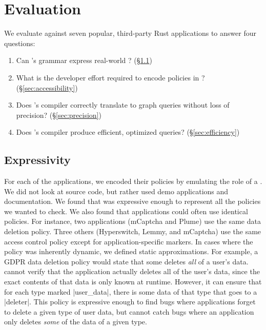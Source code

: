 \chapter{Evaluation}

We evaluate \syslang{} against seven popular, third-party Rust applications to answer four questions:
%
\begin{enumerate}[nosep]
    \item Can \syslang's grammar express real-world \policies? (\S\ref{sec:expressivity})
    \item What is the developer effort required to encode policies in \syslang? (\S\ref{sec:accessibility})
    \item Does \syslang's compiler correctly translate \policies to graph queries without loss of precision? (\S\ref{sec:precision})
    \item Does \syslang's compiler produce efficient, optimized queries? (\S\ref{sec:efficiency})
\end{enumerate}
%

\section{Expressivity}
\label{sec:expressivity}

For each of the applications, we encoded their \syslang{} policies by
emulating the role of a \ce{}.
%
We did not look at source code, but rather used demo applications and documentation.
%
We found that \syslang{} was expressive enough to represent all the policies we wanted to check.
%
We also found that applications could often use identical policies.
%
For instance, two applications (mCaptcha and Plume) use the same data deletion policy.
%
Three others (Hyperswitch, Lemmy, and mCaptcha) use the same access control policy
except for application-specific markers.
%
In cases where the policy was inherently dynamic, we defined static approximations.
%
For example, a GDPR data deletion policy would state that some \controller{} deletes \emph{all} of a user's data.
%
\sys{} cannot verify that the application actually deletes all of the user's data,
since the exact contents of that data is only known at runtime.
%
However, it can ensure that for each type marked |user_data|, 
there is some data of that type that goes to a |deleter|.
%
This policy is expressive enough to find bugs where applications forget to delete a given type of user data,
but cannot catch bugs where an application only deletes \emph{some} of the data of a given type.
%

